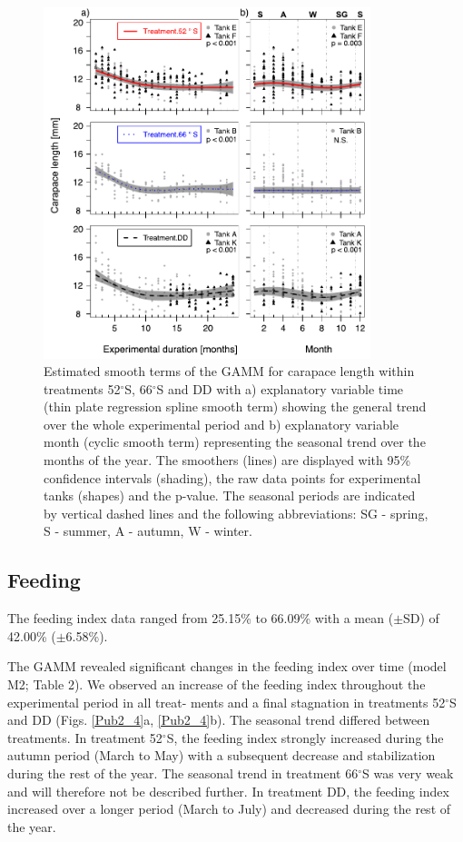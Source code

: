 \begin{figure}[ht!]
        \centering
        \includegraphics[width=0.85\textwidth]{../Figures/Pub2_3.pdf}
        \caption{Estimated smooth terms of the GAMM for carapace length within
        treatments 52$^{\circ}$S, 66$^{\circ}$S and DD with a) explanatory
        variable time (thin plate regression spline smooth term) showing the
        general trend over the whole experimental period and b) explanatory
        variable month (cyclic smooth term) representing the seasonal trend
        over the months of the year. The smoothers (lines) are displayed with
        95\% confidence intervals (shading), the raw data points for
        experimental tanks (shapes) and the p-value. The seasonal periods are
        indicated by vertical dashed lines and the following abbreviations: SG
        - spring, S - summer, A - autumn, W - winter.}
        \label{Pub2_3}
\end{figure}



\subsection{Feeding}

The feeding index data ranged from 25.15\% to 66.09\% with a mean ($\pm$SD) of
42.00\% ($\pm$6.58\%). 

The GAMM revealed significant changes in the feeding index over time (model M2;
Table 2). We observed an increase of the feeding index throughout the
experimental period in all treat- ments and a final stagnation in treatments
52$^{\circ}$S and DD (Figs. \ref{Pub2_4}a, \ref{Pub2_4}b). The seasonal trend
differed between treatments. In treatment 52$^{\circ}$S, the feeding index
strongly increased during the autumn period (March to May) with a subsequent
decrease and stabilization during the rest of the year. The seasonal trend in
treatment 66$^{\circ}$S was very weak and will therefore not be described
further. In treatment DD, the feeding index increased over a longer period
(March to July) and decreased during the rest of the year.

